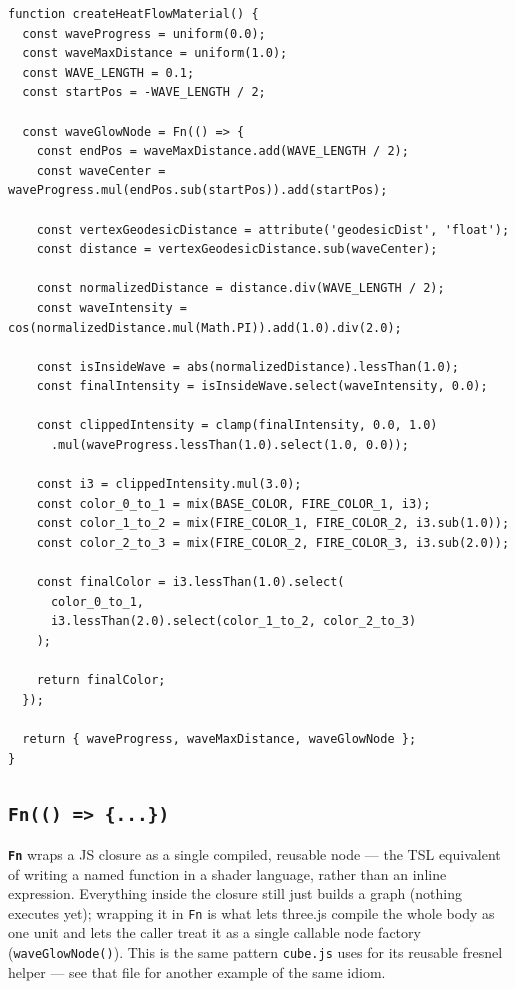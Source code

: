 \documentclass[11pt]{article}
\newcommand{\code}[1]{\texttt{#1}}
\newcommand{\func}[1]{\texttt{\textbf{#1}}}
\begin{document}
\begin{lstlisting}
function createHeatFlowMaterial() {
  const waveProgress = uniform(0.0);
  const waveMaxDistance = uniform(1.0);
  const WAVE_LENGTH = 0.1;
  const startPos = -WAVE_LENGTH / 2;

  const waveGlowNode = Fn(() => {
    const endPos = waveMaxDistance.add(WAVE_LENGTH / 2);
    const waveCenter = waveProgress.mul(endPos.sub(startPos)).add(startPos);

    const vertexGeodesicDistance = attribute('geodesicDist', 'float');
    const distance = vertexGeodesicDistance.sub(waveCenter);

    const normalizedDistance = distance.div(WAVE_LENGTH / 2);
    const waveIntensity = cos(normalizedDistance.mul(Math.PI)).add(1.0).div(2.0);

    const isInsideWave = abs(normalizedDistance).lessThan(1.0);
    const finalIntensity = isInsideWave.select(waveIntensity, 0.0);

    const clippedIntensity = clamp(finalIntensity, 0.0, 1.0)
      .mul(waveProgress.lessThan(1.0).select(1.0, 0.0));

    const i3 = clippedIntensity.mul(3.0);
    const color_0_to_1 = mix(BASE_COLOR, FIRE_COLOR_1, i3);
    const color_1_to_2 = mix(FIRE_COLOR_1, FIRE_COLOR_2, i3.sub(1.0));
    const color_2_to_3 = mix(FIRE_COLOR_2, FIRE_COLOR_3, i3.sub(2.0));

    const finalColor = i3.lessThan(1.0).select(
      color_0_to_1,
      i3.lessThan(2.0).select(color_1_to_2, color_2_to_3)
    );

    return finalColor;
  });

  return { waveProgress, waveMaxDistance, waveGlowNode };
}
\end{lstlisting}

\subsection*{\func{Fn(() => \{...\})}}
\func{Fn} wraps a JS closure as a single compiled, reusable node --- the TSL equivalent of
writing a named function in a shader language, rather than an inline expression. Everything
inside the closure still just builds a graph (nothing executes yet); wrapping it in
\code{Fn} is what lets three.js compile the whole body as one unit and lets the caller treat
it as a single callable node factory (\code{waveGlowNode()}). This is the same pattern
\code{cube.js} uses for its reusable fresnel helper --- see that file for another example
of the same idiom.
\end{document}
